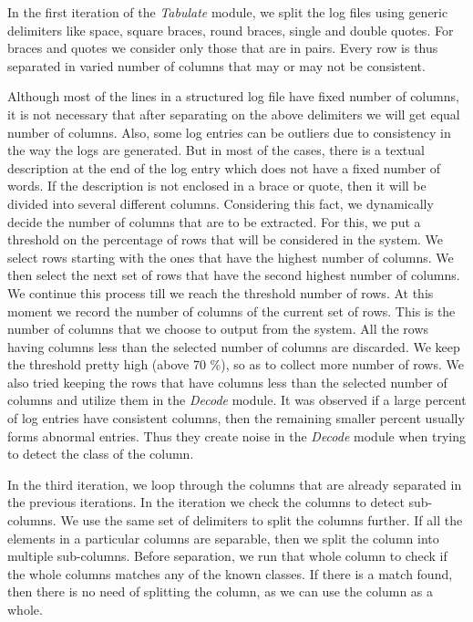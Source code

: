 In the first iteration of the \textit{Tabulate} module, we split the log files using generic delimiters like space, square braces, round braces, single and double quotes. For braces and quotes we consider only those that are in pairs. Every row is thus separated in varied number of columns that may or may not be consistent. 

Although most of the lines in a structured log file have fixed number of columns, it is not necessary that after separating on the above delimiters we will get equal number of columns. Also, some log entries can be outliers due to consistency in the way the logs are generated. But in most of the cases, there is a textual description at the end of the log entry which does not have a fixed number of words. If the description is not enclosed in a brace or quote, then it will be divided into several different columns. Considering this fact, we dynamically decide the number of columns that are to be extracted. For this, we put a threshold on the percentage of rows that will be considered in the system. We select rows starting with the ones that have the highest number of columns. We then select the next set of rows that have the second highest number of columns. We continue this process till we reach the threshold number of rows. At this moment we record the number of columns of the current set of rows. This is the number of columns that we choose to output from the system. All the rows having columns less than the selected number of columns are discarded. We keep the threshold pretty high (above 70 \%), so as to collect more number of rows. We also tried keeping the rows that have columns less than the selected number of columns and utilize them in the \textit{Decode} module. It was observed if a large percent of log entries have consistent columns, then the remaining smaller percent usually forms abnormal entries. Thus they create noise in the \textit{Decode} module when trying to detect the class of the column.

In the third iteration, we loop through the columns that are already separated in the previous iterations. In the iteration we check the columns to detect sub-columns. We use the same set of delimiters to split the columns further. If all the elements in a particular columns are separable, then we split the column into multiple sub-columns. Before separation, we run that whole column to check if the whole columns matches any of the known classes. If there is a match found, then there is no need of splitting the column, as we can use the column as a whole.


